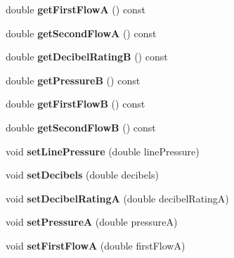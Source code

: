 \begin{DoxyCompactItemize}
double {\bfseries get\+First\+FlowA} () const
\item 
\mbox{\label{class_decibels_method_data_a77b2262f664c8678ad434caea229fc5a}} 
double {\bfseries get\+Second\+FlowA} () const
\item 
\mbox{\label{class_decibels_method_data_af5777f5bc96252758602c6f74a33974d}} 
double {\bfseries get\+Decibel\+RatingB} () const
\item 
\mbox{\label{class_decibels_method_data_a3fba2d30aece34f1c2c76bb06feeb938}} 
double {\bfseries get\+PressureB} () const
\item 
\mbox{\label{class_decibels_method_data_add15d805ea28fc11074b508fdec50ff4}} 
double {\bfseries get\+First\+FlowB} () const
\item 
\mbox{\label{class_decibels_method_data_a10ea5b45e73e2c30b22f523518d782d1}} 
double {\bfseries get\+Second\+FlowB} () const
\item 
\mbox{\label{class_decibels_method_data_a0e54af8ca1020e976911a3e301dbbbf5}} 
void {\bfseries set\+Line\+Pressure} (double line\+Pressure)
\item 
\mbox{\label{class_decibels_method_data_a58bdac4b24efd6482a3dfc3bc3afb9b1}} 
void {\bfseries set\+Decibels} (double decibels)
\item 
\mbox{\label{class_decibels_method_data_a2a3f1f527b0dee9268fac9cd588319b6}} 
void {\bfseries set\+Decibel\+RatingA} (double decibel\+RatingA)
\item 
\mbox{\label{class_decibels_method_data_a717b59f849ed3b16a96fb556605e10f6}} 
void {\bfseries set\+PressureA} (double pressureA)
\item 
\mbox{\label{class_decibels_method_data_a33b5911ea1edc369d7dbc2a6f33fd9ba}} 
void {\bfseries set\+First\+FlowA} (double first\+FlowA)
\item 
\mbox{\label{class_decibels_method_data_acc38b7f9e68051d48c613301e9451e3d}} 

\end{DoxyCompactItemize}

